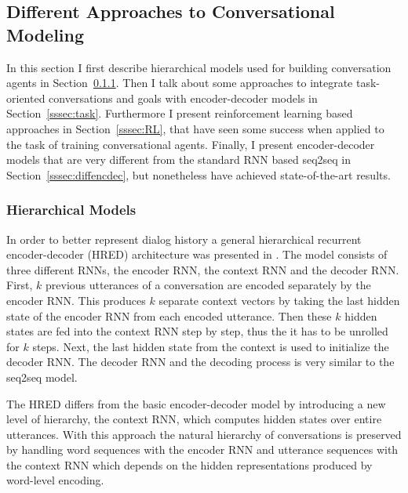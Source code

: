 \documentclass[12pt]{article}
\begin{document}
\subsection{Different Approaches to Conversational Modeling} \label{ssec:33}
In this section I first describe hierarchical models used for building conversation agents in Section~\ref{sssec:HRED}. Then I talk about some approaches to integrate task-oriented conversations and goals with encoder-decoder models in Section~\ref{sssec:task}. Furthermore I present reinforcement learning based approaches in Section~\ref{sssec:RL}, that have seen some success when applied to the task of training conversational agents. Finally, I present encoder-decoder models that are very different from the standard RNN based seq2seq in Section~\ref{sssec:diffencdec}, but nonetheless have achieved state-of-the-art results.

\subsubsection{Hierarchical Models} \label{sssec:HRED}
In order to better represent dialog history a general hierarchical recurrent encoder-decoder (HRED) architecture was presented in \cite{Serban:2015}. The model consists of three different RNNs, the encoder RNN, the context RNN and the decoder RNN. First, \(k\) previous utterances of a conversation are encoded separately by the encoder RNN. This produces \(k\) separate context vectors by taking the last hidden state of the encoder RNN from each encoded utterance. Then these \(k\) hidden states are fed into the context RNN step by step, thus the it has to be unrolled for \(k\) steps. Next, the last hidden state from the context is used to initialize the decoder RNN. The decoder RNN and the decoding process is very similar to the seq2seq model.

The HRED differs from the basic encoder-decoder model by introducing a new level of hierarchy, the context RNN, which computes hidden states over entire utterances. With this approach the natural hierarchy of conversations is preserved by handling word sequences with the encoder RNN and utterance sequences with the context RNN which depends on the hidden representations produced by word-level encoding.
\end{document}
